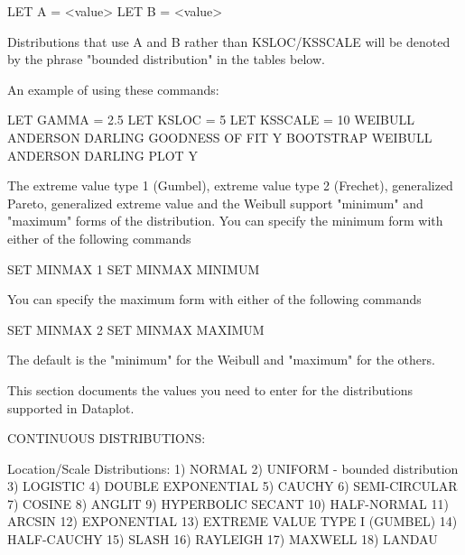           LET A = <value>
          LET B = <value>

      Distributions that use A and B rather than KSLOC/KSSCALE will
      be denoted by the phrase "bounded distribution" in the tables
      below.

      An example of using these commands:

          LET GAMMA = 2.5
          LET KSLOC = 5
          LET KSSCALE = 10
          WEIBULL ANDERSON DARLING GOODNESS OF FIT Y
          BOOTSTRAP WEIBULL ANDERSON DARLING PLOT Y

The extreme value type 1 (Gumbel), extreme value type 2 (Frechet),
generalized Pareto, generalized extreme value and the Weibull
support "minimum" and "maximum" forms of the distribution.  You
can specify the minimum form with either of the following commands

    SET MINMAX 1
    SET MINMAX MINIMUM

You can specify the maximum form with either of the following commands

    SET MINMAX 2
    SET MINMAX MAXIMUM

The default is the "minimum" for the Weibull and "maximum" for the
others.

This section documents the values you need to enter for the distributions
supported in Dataplot.

CONTINUOUS DISTRIBUTIONS:

Location/Scale Distributions:
      1) NORMAL
      2) UNIFORM - bounded distribution
      3) LOGISTIC
      4) DOUBLE EXPONENTIAL
      5) CAUCHY
      6) SEMI-CIRCULAR
      7) COSINE
      8) ANGLIT
      9) HYPERBOLIC SECANT
     10) HALF-NORMAL
     11) ARCSIN
     12) EXPONENTIAL
     13) EXTREME VALUE TYPE I (GUMBEL)
     14) HALF-CAUCHY
     15) SLASH
     16) RAYLEIGH
     17) MAXWELL
     18) LANDAU

